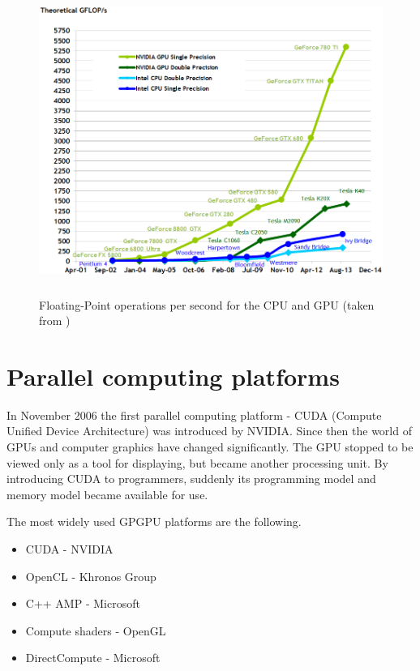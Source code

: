\begin{center}
\begin{figure}[ht]
	\centering\includegraphics[height=10cm]{fig/floating-point-operations-per-second.png}
	\caption{Floating-Point operations per second for the CPU and GPU (taken from \cite{cuda-toolkit-docs})}
\end{figure}
\end{center}

\section{Parallel computing platforms}

In November 2006 the first parallel computing platform - CUDA (Compute Unified Device Architecture) was introduced by NVIDIA. Since then the world of GPUs and computer graphics have changed significantly. The GPU stopped to be viewed only as a tool for displaying, but became another processing unit. By introducing CUDA to programmers, suddenly its programming model and memory model became available for use. 

The most widely used GPGPU platforms are the following.

\begin{itemize}
	\item CUDA - NVIDIA
	\item OpenCL - Khronos Group
	\item C++ AMP - Microsoft	
	\item Compute shaders - OpenGL
	\item DirectCompute - Microsoft
\end{itemize}


